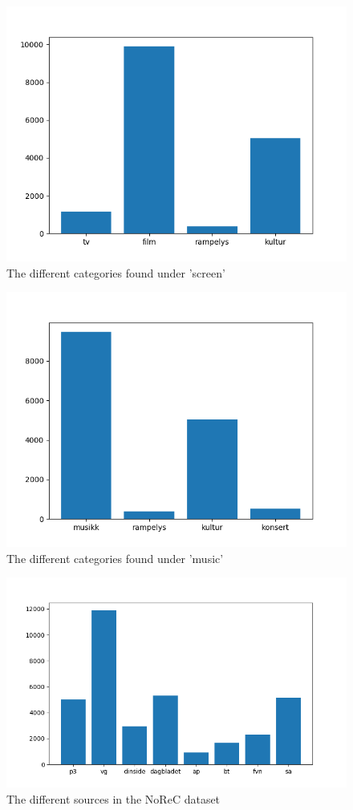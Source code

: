 \begin{figure}[h!]
	\centering
	\includegraphics[scale=0.5]{img/screen_categories}
	\caption{The different categories found under 'screen'}
	\label{fig:screen}
\end{figure}%
\begin{figure}[h!]
	\centering
	\includegraphics[scale=0.5]{img/music_categories}
	\caption{The different categories found under 'music'}
	\label{fig:music}
\end{figure}%
\begin{figure}[h!]
	\centering
	\includegraphics[scale=0.5]{img/src_dist}
	\caption{The different sources in the NoReC dataset}
	\label{fig:sources}
\end{figure}%
